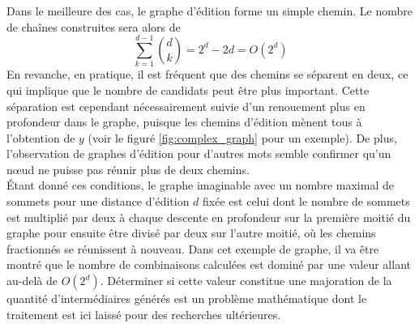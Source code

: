 \documentclass[12pt, twoside]{report}
\begin{document}
Dans le meilleure des cas, le graphe d'édition forme un simple chemin. Le nombre de chaînes construites sera alors de
\begin{equation}
    \sum_{k=1}^{d-1} {{d}\choose{k}} = 2^d - 2d = O(2^d)
\end{equation}
En revanche, en pratique, il est fréquent que des chemins se séparent en deux, ce qui implique que le nombre de candidats peut être plus important. Cette séparation est cependant nécessairement suivie d'un renouement plus en profondeur dans le graphe, puisque les chemins d'édition mènent tous à l'obtention de $y$ (voir le figuré \ref{fig:complex_graph} pour un exemple). De plus, l'observation de graphes d'édition pour d'autres mots semble confirmer qu'un n\oe{}ud ne puisse pas réunir plus de deux chemins.\\
Étant donné ces conditions, le graphe imaginable avec un nombre maximal de sommets pour une distance d'édition $d$ fixée est celui dont le nombre de sommets est multiplié par deux à chaque descente en profondeur sur la première moitié du graphe pour ensuite être divisé par deux sur l'autre moitié, où les chemins fractionnés se réunissent à nouveau. Dans cet exemple de graphe, il va être montré que le nombre de combinaisons calculées est dominé par une valeur allant au-delà de $O(2^d)$. Déterminer si cette valeur constitue une majoration de la quantité d'intermédiaires générés est un problème mathématique dont le traitement est ici laissé pour des recherches ultérieures.
\end{document}
